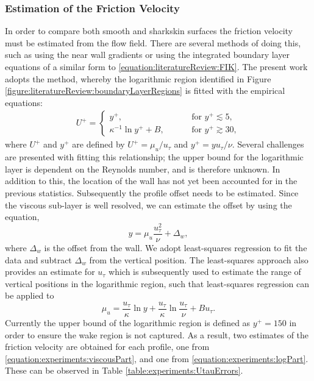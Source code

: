 \documentclass[12pt,oneside,a4paper]{article}
\begin{document}
\subsubsection*{Estimation of the Friction Velocity}
In order to compare both smooth and sharkskin surfaces the friction velocity must be estimated from the flow field. There are several methods of doing this, such as using the near wall gradients or using the integrated boundary layer equations of a similar form to \eqref{equation:literatureReview:FIK}. The present work adopts the \cite{clauser1956} method, whereby the logarithmic region identified in Figure \ref{figure:literatureReview:boundaryLayerRegions} is fitted with the empirical equations:
\begin{align}
U^+ = \begin{cases}	
y^+, \hspace{1cm} &\text{for } y^+ \lesssim 5,\\
\kappa^{-1} \ln{y^+} + B, \hspace{1cm} &\text{for } y^+ \gtrsim 30,
\end{cases}
\end{align}
where $U^+$ and $y^+$ are defined by $ U^+ = \mu_u / u_\tau $ and $ y^+ = y u_\tau / \nu$. Several challenges are presented with fitting this relationship; the upper bound for the logarithmic layer is dependent on the Reynolds number, and is therefore unknown. In addition to this, the location of the wall has not yet been accounted for in the previous statistics. Subsequently the profile offset needs to be estimated. Since the viscous sub-layer is well resolved, we can estimate the offset by using the equation,
\begin{equation}
\label{equation:experiments:viscousPart}
y = \mu_u \frac{u_\tau^2}{\nu} + \Delta_w,
\end{equation}
where $\Delta_w$ is the offset from the wall. We adopt least-squares regression to fit the data and subtract $\Delta_w$ from the vertical position. The least-squares approach also provides an estimate for $u_\tau$ which is subsequently used to estimate the range of vertical positions in the logarithmic region, such that least-squares regression can be applied to
\begin{equation}
\label{equation:experiments:logPart}
\mu_u = \frac{u_\tau}{\kappa} \ln{y} + \frac{u_\tau}{\kappa}\ln{\frac{u_\tau}{\nu}} + Bu_\tau.
\end{equation}
Currently the upper bound of the logarithmic region is defined as $y^+ = 150$ in order to ensure the wake region is not captured. As a result, two estimates of the friction velocity are obtained for each profile, one from \eqref{equation:experiments:viscousPart}, and one from \eqref{equation:experiments:logPart}. These can be observed in Table \ref{table:experiments:UtauErrors}.
\end{document}
